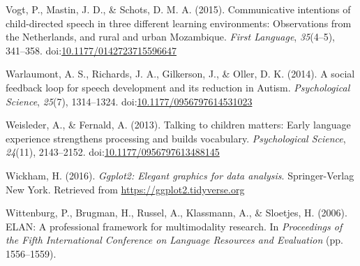 \documentclass[,man,floatsintext]{apa6}
\begin{document}
\hypertarget{ref-vogt2015communicative}{}
Vogt, P., Mastin, J. D., \& Schots, D. M. A. (2015). Communicative
intentions of child-directed speech in three different learning
environments: Observations from the Netherlands, and rural and urban
Mozambique. \emph{First Language}, \emph{35}(4--5), 341--358.
doi:\href{https://doi.org/10.1177/0142723715596647}{10.1177/0142723715596647}

\hypertarget{ref-warlaumont2014social}{}
Warlaumont, A. S., Richards, J. A., Gilkerson, J., \& Oller, D. K.
(2014). A social feedback loop for speech development and its reduction
in Autism. \emph{Psychological Science}, \emph{25}(7), 1314--1324.
doi:\href{https://doi.org/10.1177/0956797614531023}{10.1177/0956797614531023}

\hypertarget{ref-weisleder2013talking}{}
Weisleder, A., \& Fernald, A. (2013). Talking to children matters: Early
language experience strengthens processing and builds vocabulary.
\emph{Psychological Science}, \emph{24}(11), 2143--2152.
doi:\href{https://doi.org/10.1177/0956797613488145}{10.1177/0956797613488145}

\hypertarget{ref-R-ggplot2}{}
Wickham, H. (2016). \emph{Ggplot2: Elegant graphics for data analysis}.
Springer-Verlag New York. Retrieved from
\url{https://ggplot2.tidyverse.org}

\hypertarget{ref-ELAN}{}
Wittenburg, P., Brugman, H., Russel, A., Klassmann, A., \& Sloetjes, H.
(2006). ELAN: A professional framework for multimodality research. In
\emph{Proceedings of the Fifth International Conference on Language
Resources and Evaluation} (pp. 1556--1559).

\endgroup
\end{document}
